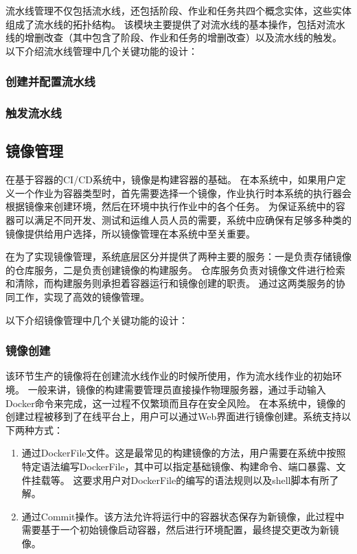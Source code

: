 流水线管理不仅包括流水线，还包括阶段、作业和任务共四个概念实体，这些实体组成了流水线的拓扑结构。
该模块主要提供了对流水线的基本操作，包括对流水线的增删改查（其中包含了阶段、作业和任务的增删改查）以及流水线的触发。
以下介绍流水线管理中几个关键功能的设计：

\subsubsection{创建并配置流水线}

\subsubsection{触发流水线}


\subsection{镜像管理}
\label{subsec:镜像管理}

在基于容器的CI/CD系统中，镜像是构建容器的基础。
在本系统中，如果用户定义一个作业为容器类型时，首先需要选择一个镜像，作业执行时本系统的执行器会根据镜像来创建环境，然后在环境中执行作业中的各个任务。
为保证系统中的容器可以满足不同开发、测试和运维人员人员的需要，系统中应确保有足够多种类的镜像提供给用户选择，所以镜像管理在本系统中至关重要。

在为了实现镜像管理，系统底层区分并提供了两种主要的服务：一是负责存储镜像的仓库服务，二是负责创建镜像的构建服务。
仓库服务负责对镜像文件进行检索和清除，而构建服务则承担着容器运行和镜像创建的职责。
通过这两类服务的协同工作，实现了高效的镜像管理。

以下介绍镜像管理中几个关键功能的设计：

\subsubsection{镜像创建}

该环节生产的镜像将在创建流水线作业的时候所使用，作为流水线作业的初始环境。
一般来讲，镜像的构建需要管理员直接操作物理服务器，通过手动输入Docker命令来完成，这一过程不仅繁琐而且存在安全风险。
在本系统中，镜像的创建过程被移到了在线平台上，用户可以通过Web界面进行镜像创建。系统支持以下两种方式：
\begin{enumerate}
  \item 通过DockerFile文件。这是最常见的构建镜像的方法，用户需要在系统中按照特定语法编写DockerFile，其中可以指定基础镜像、构建命令、端口暴露、文件挂载等。
  这要求用户对DockerFile的编写的语法规则以及shell脚本有所了解。
  \item 通过Commit操作。该方法允许将运行中的容器状态保存为新镜像，此过程中需要基于一个初始镜像启动容器，然后进行环境配置，最终提交更改为新镜像。
\end{enumerate}


